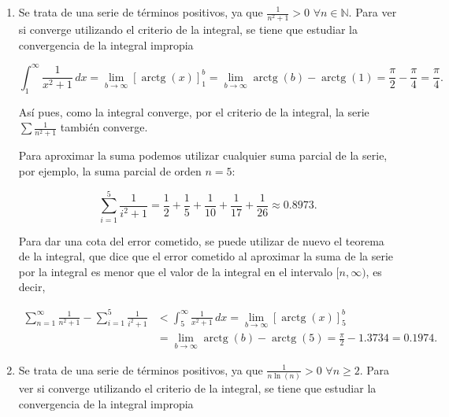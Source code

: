 \documentclass[
  spanish,
  a4paper,
]{scrreport}
\theoremstyle{definition}
\theoremstyle{remark}
\begin{document}
\begin{tcolorbox}[enhanced jigsaw, arc=.35mm, bottomrule=.15mm, bottomtitle=1mm, breakable, colback=white, colbacktitle=quarto-callout-tip-color!10!white, colframe=quarto-callout-tip-color-frame, coltitle=black, left=2mm, leftrule=.75mm, opacityback=0, opacitybacktitle=0.6, rightrule=.15mm, title=\textcolor{quarto-callout-tip-color}{\faLightbulb}\hspace{0.5em}{Solución}, titlerule=0mm, toprule=.15mm, toptitle=1mm]

\begin{enumerate}
\def\labelenumi{\alph{enumi}.}
\item
  Se trata de una serie de términos positivos, ya que
  \(\frac{1}{n^2+1}>0\) \(\forall n\in\mathbb{N}\). Para ver si converge
  utilizando el criterio de la integral, se tiene que estudiar la
  convergencia de la integral impropia

  \[
  \int_1^\infty \frac{1}{x^2+1}\,dx = \lim_{b\to\infty}\left[\operatorname{arctg}(x)\right]_1^b = \lim_{b\to\infty} \operatorname{arctg}(b)-\operatorname{arctg}(1) = \frac{\pi}{2}-\frac{\pi}{4} = \frac{\pi}{4}.
  \]

  Así pues, como la integral converge, por el criterio de la integral,
  la serie \(\sum \frac{1}{n^2+1}\) también converge.

  Para aproximar la suma podemos utilizar cualquier suma parcial de la
  serie, por ejemplo, la suma parcial de orden \(n=5\):

  \[
  \sum_{i=1}^5 \frac{1}{i^2+1} = \frac{1}{2}+\frac{1}{5}+\frac{1}{10}+\frac{1}{17}+\frac{1}{26} \approx 0.8973.
  \]

  Para dar una cota del error cometido, se puede utilizar de nuevo el
  teorema de la integral, que dice que el error cometido al aproximar la
  suma de la serie por la integral es menor que el valor de la integral
  en el intervalo \([n,\infty)\), es decir,

  \begin{align*}
  \sum_{n=1}^\infty \frac{1}{n^2+1} - \sum_{i=1}^5 \frac{1}{i^2+1}
  &< \int_5^\infty \frac{1}{x^2+1}\,dx 
  = \lim_{b\to\infty}\left[\operatorname{arctg}(x)\right]_5^b \\
  &= \lim_{b\to\infty} \operatorname{arctg}(b)-\operatorname{arctg}(5) 
  = \frac{\pi}{2} - 1.3734 = 0.1974.
  \end{align*}
\item
  Se trata de una serie de términos positivos, ya que
  \(\frac{1}{n\ln(n)}>0\) \(\forall n\geq 2\). Para ver si converge
  utilizando el criterio de la integral, se tiene que estudiar la
  convergencia de la integral impropia


\end{enumerate}
\end{tcolorbox}
\end{document}
